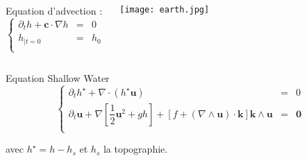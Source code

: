 \documentclass[11pt]{beamer}
\begin{document}
\begin{frame}

\begin{columns}
\begin{block}{Equation d'advection :}
\begin{equation}
\left\lbrace
\begin{array}{rcl}
\partial_t h + \mathbf{c} \cdot \nabla h & = & 0 \\
h_{|t=0} & = & h_0 \\
\end{array}
\right.
\end{equation}
\end{block}

\begin{center}
\texttt{[image: earth.jpg]}
\end{center}

\end{columns}

\pause
\begin{block}{Equation Shallow Water}
\begin{equation}
\left\lbrace
\begin{array}{rcl}
\partial_t h^{\star} + \nabla \cdot \left( h^{\star} \mathbf{u} \right) & = & 0 \\
\partial_t \mathbf{u} + \nabla \left[ \dfrac{1}{2} \mathbf{u}^2 + gh \right] + \left[f + \left( \nabla \wedge \mathbf{u} \right) \cdot \mathbf{k} \right] \mathbf{k} \wedge \mathbf{u} & = & \mathbf{0} \\
\end{array}
\right.
\end{equation}

avec $h^{\star} = h - h_s$ et $h_s$ la topographie.
\end{block}

\end{frame}

\begin{frame}
\tableofcontents
\end{frame}

\end{document}
